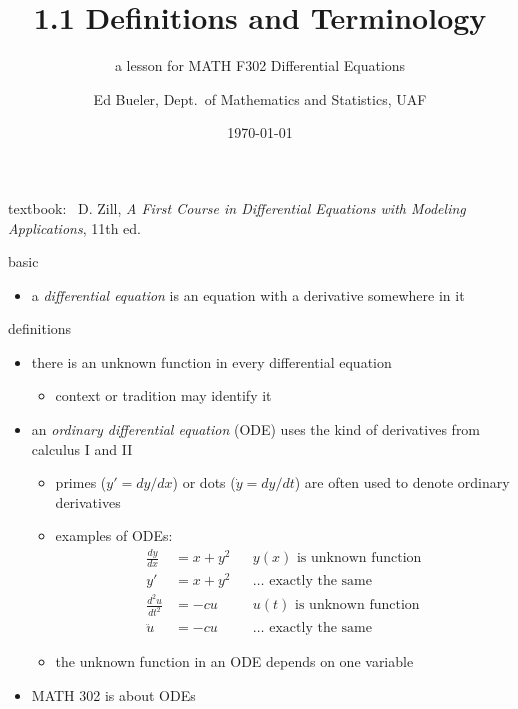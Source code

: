 \documentclass{beamer}
\title{1.1 Definitions and Terminology}
\subtitle{a lesson for MATH F302 Differential Equations}
\date{\today}
\author{Ed Bueler, Dept.~of Mathematics and Statistics, UAF}
\begin{document}


\begin{frame}
\titlepage

\centerline{\tiny textbook: \, D. Zill, \emph{A First Course in Differential Equations with Modeling Applications}, 11th ed.}
\end{frame}

\begin{frame}{basic}

\begin{itemize}
\item a \emph{differential equation} is an equation with a derivative somewhere in it
\end{itemize}
\end{frame}

\begin{frame}{definitions}

\begin{itemize}
\item there is an unknown function in every differential equation
    \begin{itemize}
    \item context or tradition may identify it
    \end{itemize}
\item an \emph{ordinary differential equation} (ODE) uses the kind of derivatives from calculus I and II
    \begin{itemize}
    \item primes ($y' = dy/dx$) or dots ($\dot y = dy/dt$) are often used to denote ordinary derivatives
    \item examples of ODEs:
\begin{align*}
\frac{dy}{dx} &= x + y^2 && y(x) \text{ is unknown function} \\
y' &= x + y^2 && \dots \text{ exactly the same} \\
\frac{d^2 u}{dt^2} &= - c u && u(t) \text{ is unknown function} \\
\ddot u &= - c u && \dots \text{ exactly the same}
\end{align*}
    \item the unknown function in an ODE depends on one variable
    \end{itemize}

\medskip
\item MATH 302 is about ODEs
\end{itemize}
\end{frame}
\end{document}
